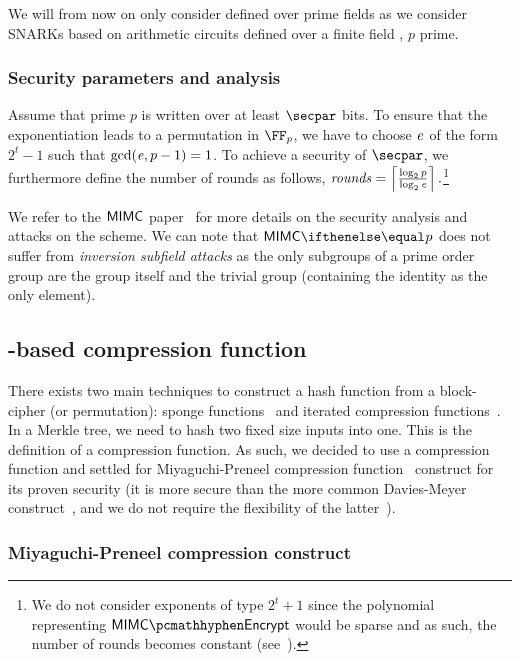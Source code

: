 We will from now on only consider \mimc{} defined over prime fields as we consider SNARKs based on arithmetic circuits defined over a finite field , $p$ prime.

\subsubsection{Security parameters and analysis}\label{instantiation:mkhash:mimc-encryption:security}

Assume that prime $p$ is written over at least $\secpar$ bits. To ensure that the exponentiation leads to a permutation in $\FFx{p}$, we have to choose $\mathit{e}{}$ of the form $2^t-1$ such that $\gcd(\mathit{e}{}, p-1) = 1$. To achieve a security of $\secpar$, we furthermore define the number of rounds as follows, $\mathit{rounds} = \left\lceil \frac{\log_2 p}{\log_2 \mathit{e}{}} \right\rceil. $\footnote{We do not consider exponents of type $2^t+1$ since the polynomial representing $\mimcEnc$ would be sparse and as such, the number of rounds becomes constant (see~\cite[Section 5.3]{albrecht2016mimc}).}

We refer to the $\mathsf{MIMC{}}$ paper~\cite[Section 4.2 and 5.1]{albrecht2016mimc} for more details on the security analysis and attacks on the scheme. We can note that $\mimcPrime{p}$ does not suffer from \emph{inversion subfield attacks} as the only subgroups of a prime order group are the group itself and the trivial group (containing the identity as the only element).

\subsection{\mimc{}-based compression function}\label{instantiation:mkhash:mimc-compressionf}

There exists two main techniques to construct a hash function from a block-cipher (or permutation): sponge functions~\cite{bertoni2007sponge} and iterated compression functions~\cite{black2002black}.
In a Merkle tree, we need to hash two fixed size inputs into one. This is the definition of a compression function. As such, we decided to use a compression function and settled for Miyaguchi-Preneel compression function~\cite[$f_3$ function]{black2002black} construct for its proven security (it is more secure than the more common Davies-Meyer construct~\cite[$f_5$ function]{black2002black}, and we do not require the flexibility of the latter~\cite[Section 3]{gazzoni2006maelstrom}).

\subsubsection{Miyaguchi-Preneel compression construct}

